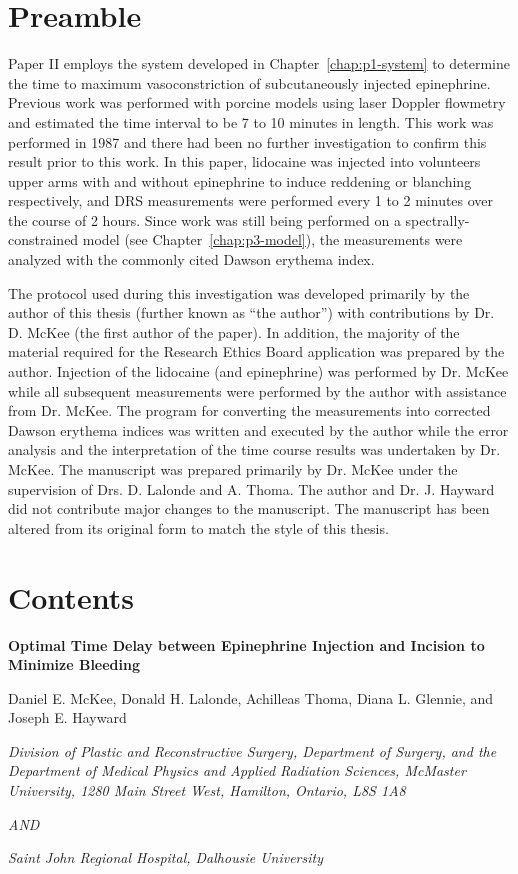 \label{chap:p2-mckee}
\section*{Preamble}
Paper II employs the system developed in Chapter~\ref{chap:p1-system} to determine the time to maximum vasoconstriction of subcutaneously injected epinephrine. Previous work was performed with porcine models using laser Doppler flowmetry and estimated the time interval to be 7 to 10 minutes in length.\cite{Larrabee1987} This work was performed in 1987 and there had been no further investigation to confirm this result prior to this work. In this paper, lidocaine was injected into volunteers upper arms with and without epinephrine to induce reddening or blanching respectively, and DRS measurements were performed every 1 to 2 minutes over the course of 2 hours. Since work was still being performed on a spectrally-constrained model (see Chapter~\ref{chap:p3-model}), the measurements were analyzed with the commonly cited Dawson erythema index.\cite{Dawson1980}

The protocol used during this investigation was developed primarily by the author of this thesis (further known as ``the author'') with contributions by Dr. D. McKee (the first author of the paper). In addition, the majority of the material required for the Research Ethics Board application was prepared by the author. Injection of the lidocaine (and epinephrine) was performed by Dr. McKee while all subsequent measurements were performed by the author with assistance from Dr. McKee. The program for converting the measurements into corrected Dawson erythema indices was written and executed by the author while the error analysis and the interpretation of the time course results was undertaken by Dr. McKee. The manuscript was prepared primarily by Dr. McKee under the supervision of Drs. D. Lalonde and A. Thoma. The author and Dr. J. Hayward did not contribute major changes to the manuscript. The manuscript has been altered from its original form to match the style of this thesis.

\section*{Contents}

\begin{center}

\textbf{Optimal Time Delay between Epinephrine Injection and Incision to Minimize Bleeding}

Daniel E. McKee, Donald H. Lalonde, Achilleas Thoma, Diana L. Glennie, and Joseph E. Hayward

\textit{Division of Plastic and Reconstructive Surgery, Department of Surgery, and the Department of Medical Physics and Applied Radiation Sciences, McMaster University, 1280 Main Street West, Hamilton, Ontario, L8S 1A8}

\textit{AND}

\textit{Saint John Regional Hospital, Dalhousie University}

\end{center}

